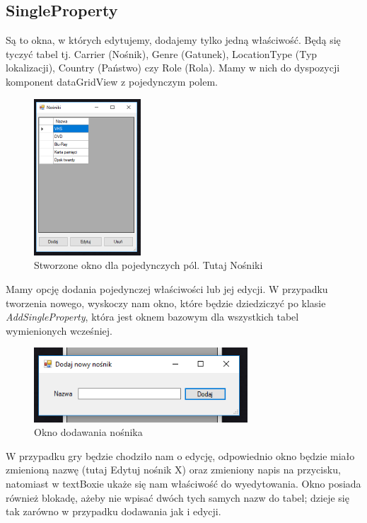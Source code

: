 \documentclass{article}
\begin{document}
\subsection{SingleProperty}
Są to okna, w których edytujemy, dodajemy tylko jedną właściwość. Będą się tyczyć tabel tj. Carrier (Nośnik), Genre (Gatunek), LocationType (Typ lokalizacji), Country (Państwo) czy Role (Rola). Mamy w nich do dyspozycji komponent dataGridView z pojedynczym polem. 
\begin{figure}[!ht]
\centering
\includegraphics[width=4cm]{carrier.PNG}
\caption{Stworzone okno dla pojedynczych pól. Tutaj Nośniki}
\end{figure}
Mamy opcję dodania pojedynczej właściwości lub jej edycji. W przypadku tworzenia nowego, wyskoczy nam okno, które będzie dziedziczyć po klasie \textit{AddSingleProperty}, która jest oknem bazowym dla wszystkich tabel wymienionych wcześniej. 
\begin{figure}[!ht]
\centering
\includegraphics[width=8cm]{addcarrier.PNG}
\caption{Okno dodawania nośnika}
\end{figure}

W przypadku gry będzie chodziło nam o edycję, odpowiednio okno będzie miało zmienioną nazwę (tutaj Edytuj nośnik X) oraz zmieniony napis na przycisku, natomiast w textBoxie ukaże się nam właściwość do wyedytowania. Okno posiada również blokadę, ażeby nie wpisać dwóch tych samych nazw do tabel; dzieje się tak zarówno w przypadku dodawania jak i edycji.
\newpage
\end{document}
